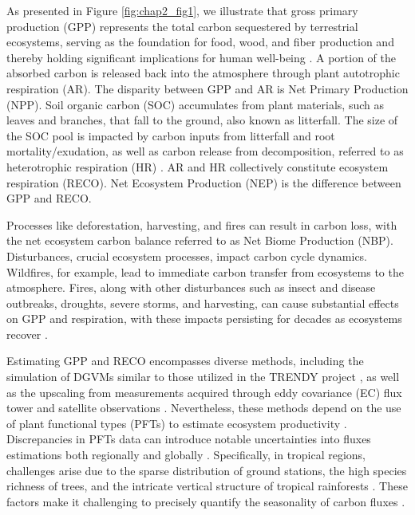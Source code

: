 As presented in Figure \ref{fig:chap2_fig1}, we illustrate that gross primary production (GPP) represents the total carbon sequestered by terrestrial ecosystems, serving as the foundation for food, wood, and fiber production and thereby holding significant implications for human well-being \citep{xiao2019remote}. A portion of the absorbed carbon is released back into the atmosphere through plant autotrophic respiration (AR). The disparity between GPP and AR is Net Primary Production (NPP). Soil organic carbon (SOC) accumulates from plant materials, such as leaves and branches, that fall to the ground, also known as litterfall. The size of the SOC pool is impacted by carbon inputs from litterfall and root mortality/exudation, as well as carbon release from decomposition, referred to as heterotrophic respiration (HR) \citep{liu2011simulating}. AR and HR collectively constitute ecosystem respiration (RECO). Net Ecosystem Production (NEP) is the difference between GPP and RECO. \par
Processes like deforestation, harvesting, and fires can result in carbon loss, with the net ecosystem carbon balance referred to as Net Biome Production (NBP). Disturbances, crucial ecosystem processes, impact carbon cycle dynamics. Wildfires, for example, lead to immediate carbon transfer from ecosystems to the atmosphere. Fires, along with other disturbances such as insect and disease outbreaks, droughts, severe storms, and harvesting, can cause substantial effects on GPP and respiration, with these impacts persisting for decades as ecosystems recover \citep{xiao2019remote}. \par

Estimating GPP and RECO encompasses diverse methods, including the simulation of DGVMs similar to those utilized in the TRENDY project \citep{sitch2015recent, le2018global}, as well as the upscaling from measurements acquired through eddy covariance (EC) flux tower and satellite observations \citep{jung2019fluxcom, zeng2020global}. Nevertheless, these methods depend on the use of plant functional types (PFTs) to estimate ecosystem productivity \citep{poulter2011plant, poulter2015plant, lin2021improved, guo2023estimating, yan2023integrating}. Discrepancies in PFTs data can introduce notable uncertainties into fluxes estimations both regionally and globally \citep{poulter2011plant}. Specifically, in tropical regions, challenges arise due to the sparse distribution of ground stations, the high species richness of trees, and the intricate vertical structure of tropical rainforests \citep{montgomery2001forest}. These factors make it challenging to precisely quantify the seasonality of carbon fluxes \citep{xu2015satellite}.


